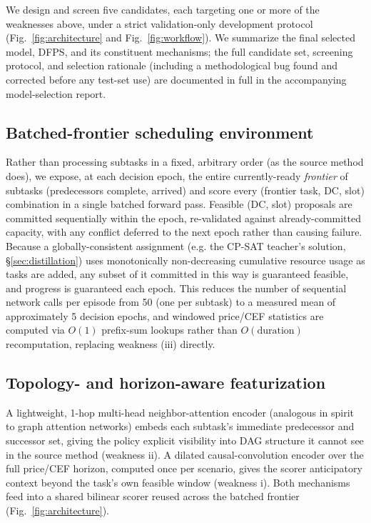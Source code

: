 \documentclass[journal]{IEEEtran}
\begin{document}
We design and screen five candidates, each targeting one or more of the weaknesses above, under a strict validation-only development protocol (Fig.~\ref{fig:architecture} and Fig.~\ref{fig:workflow}). We summarize the final selected model, DFPS, and its constituent mechanisms; the full candidate set, screening protocol, and selection rationale (including a methodological bug found and corrected before any test-set use) are documented in full in the accompanying model-selection report.

\subsection{Batched-frontier scheduling environment}
Rather than processing subtasks in a fixed, arbitrary order (as the source method does), we expose, at each decision epoch, the entire currently-ready \textit{frontier} of subtasks (predecessors complete, arrived) and score every (frontier task, DC, slot) combination in a single batched forward pass. Feasible (DC, slot) proposals are committed sequentially within the epoch, re-validated against already-committed capacity, with any conflict deferred to the next epoch rather than causing failure. Because a globally-consistent assignment (e.g. the CP-SAT teacher's solution, \S\ref{sec:distillation}) uses monotonically non-decreasing cumulative resource usage as tasks are added, any subset of it committed in this way is guaranteed feasible, and progress is guaranteed each epoch. This reduces the number of sequential network calls per episode from 50 (one per subtask) to a measured mean of approximately 5 decision epochs, and windowed price/CEF statistics are computed via $O(1)$ prefix-sum lookups rather than $O(\text{duration})$ recomputation, replacing weakness (iii) directly.

\subsection{Topology- and horizon-aware featurization}
A lightweight, 1-hop multi-head neighbor-attention encoder (analogous in spirit to graph attention networks) embeds each subtask's immediate predecessor and successor set, giving the policy explicit visibility into DAG structure it cannot see in the source method (weakness ii). A dilated causal-convolution encoder over the full price/CEF horizon, computed once per scenario, gives the scorer anticipatory context beyond the task's own feasible window (weakness i). Both mechanisms feed into a shared bilinear scorer reused across the batched frontier (Fig.~\ref{fig:architecture}).
\end{document}

